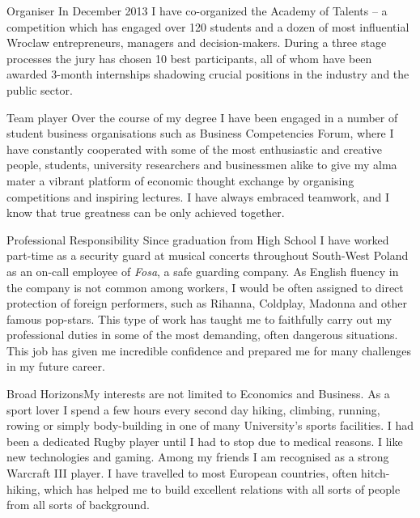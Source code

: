\documentclass{tccv}
\begin{document}
\begin{skillist}
\item{Organiser} {In December 2013 I have co-organized the Academy of Talents -- a competition which has engaged over 120 students and a dozen of most influential Wroclaw entrepreneurs, managers and decision-makers. During a three stage processes the jury has chosen 10 best participants, all of whom have been awarded 3-month internships shadowing crucial positions in the industry and the public sector.}
\item{Team player} {Over the course of my degree I have been engaged in a number of student business organisations such as Business Competencies Forum, where I have constantly cooperated with some of the most enthusiastic and creative people, students, university researchers and businessmen alike to give my alma mater a vibrant platform of economic thought exchange by organising competitions and inspiring lectures. I have always embraced teamwork, and I know that true greatness can be only achieved together.}
\item{Professional Responsibility} {Since graduation from High School I have worked part-time as a security guard at musical concerts throughout South-West Poland as an on-call employee of \textit{Fosa}, a safe guarding company. As English fluency in the company is not common among workers, I would be often assigned to direct protection of foreign performers, such as Rihanna, Coldplay, Madonna and other famous pop-stars. This type of work has taught me to faithfully carry out my professional duties in some of the most demanding, often dangerous situations. This job has given me incredible confidence and prepared me for many challenges in my future career.}
\item{Broad Horizons}{My interests are not limited to Economics and Business. As a sport lover I spend a few hours every second day hiking, climbing, running, rowing or simply body-building in one of many University's sports facilities. I had been a dedicated Rugby player until I had to stop due to medical reasons. I like new technologies and gaming. Among my friends I am recognised as a strong Warcraft III player. I have travelled to most European countries, often hitch-hiking, which has helped me to build excellent relations with all sorts of people from all sorts of background.}
\end{skillist}

\newpage

\section{\specialname}
\specialcontents
\end{document}
